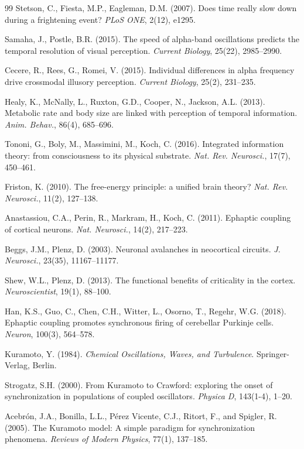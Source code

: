 \documentclass[12pt]{article}
\begin{document}
\begin{thebibliography}{99}
Stetson, C., Fiesta, M.P., Eagleman, D.M. (2007). Does time really slow down during a frightening event? \textit{PLoS ONE}, 2(12), e1295.

Samaha, J., Postle, B.R. (2015). The speed of alpha-band oscillations predicts the temporal resolution of visual perception. \textit{Current Biology}, 25(22), 2985--2990.

Cecere, R., Rees, G., Romei, V. (2015). Individual differences in alpha frequency drive crossmodal illusory perception. \textit{Current Biology}, 25(2), 231--235.

Healy, K., McNally, L., Ruxton, G.D., Cooper, N., Jackson, A.L. (2013). Metabolic rate and body size are linked with perception of temporal information. \textit{Anim. Behav.}, 86(4), 685--696.

Tononi, G., Boly, M., Massimini, M., Koch, C. (2016). Integrated information theory: from consciousness to its physical substrate. \textit{Nat. Rev. Neurosci.}, 17(7), 450--461.

Friston, K. (2010). The free-energy principle: a unified brain theory? \textit{Nat. Rev. Neurosci.}, 11(2), 127--138.

Anastassiou, C.A., Perin, R., Markram, H., Koch, C. (2011). Ephaptic coupling of cortical neurons. \textit{Nat. Neurosci.}, 14(2), 217--223.

Beggs, J.M., Plenz, D. (2003). Neuronal avalanches in neocortical circuits. \textit{J. Neurosci.}, 23(35), 11167--11177.

Shew, W.L., Plenz, D. (2013). The functional benefits of criticality in the cortex. \textit{Neuroscientist}, 19(1), 88--100.

Han, K.S., Guo, C., Chen, C.H., Witter, L., Osorno, T., Regehr, W.G. (2018). Ephaptic coupling promotes synchronous firing of cerebellar Purkinje cells. \textit{Neuron}, 100(3), 564--578.

Kuramoto, Y. (1984). \textit{Chemical Oscillations, Waves, and Turbulence}. Springer-Verlag, Berlin.

Strogatz, S.H. (2000). From Kuramoto to Crawford: exploring the onset of synchronization in populations of coupled oscillators. \textit{Physica D}, 143(1-4), 1--20.

Acebr\'{o}n, J.A., Bonilla, L.L., P\'{e}rez Vicente, C.J., Ritort, F., and Spigler, R. (2005). The Kuramoto model: A simple paradigm for synchronization phenomena. \textit{Reviews of Modern Physics}, 77(1), 137--185.


\end{thebibliography}
\end{document}
